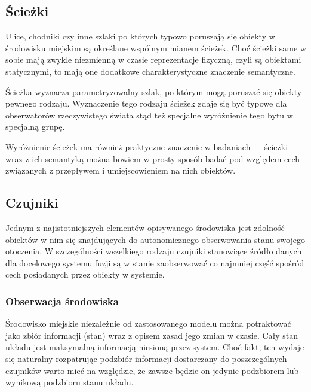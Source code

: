 {\subsection{Ścieżki}
\par{
Ulice, chodniki czy inne szlaki po których typowo poruszają się obiekty w środowisku miejskim są określane wspólnym mianem ścieżek. Choć ścieżki same w sobie mają zwykle niezmienną w czasie reprezentacje fizyczną, czyli są obiektami statycznymi, to mają one dodatkowe charakterystyczne znaczenie semantyczne.
}
\par{
Ścieżka wyznacza parametryzowalny szlak, po którym mogą poruszać się obiekty pewnego rodzaju. Wyznaczenie tego rodzaju ścieżek zdaje się być typowe dla obserwatorów rzeczywistego świata stąd też specjalne wyróżnienie tego bytu w specjalną grupę.
}
\par{
Wyróżnienie ścieżek ma również praktyczne znaczenie w badaniach --- ścieżki wraz z ich semantyką można bowiem w prosty sposób badać pod względem cech związanych z przepływem i umiejscowieniem na nich obiektów.
}
\subsection{Czujniki}
\par{
Jednym z najistotniejszych elementów opisywanego środowiska jest zdolność obiektów w nim się znajdujących do autonomicznego obserwowania stanu swojego otoczenia. W szczególności wszelkiego rodzaju czujniki stanowiące źródło danych dla docelowego systemu fuzji są w stanie zaobserwować co najmniej część  spośród cech posiadanych przez obiekty w systemie.
}

\subsubsection{Obserwacja środowiska}
\par{
Środowisko miejskie niezależnie od zastosowanego modelu można potraktować jako zbiór informacji (stan) wraz z opisem zasad jego zmian w czasie. Cały stan układu jest maksymalną informacją niesioną przez system. Choć fakt, ten wydaje się naturalny rozpatrując podzbiór informacji dostarczany do poszczególnych czujników warto mieć na względzie, że zawsze będzie on jedynie podzbiorem lub wynikową podzbioru stanu układu.
}

}
